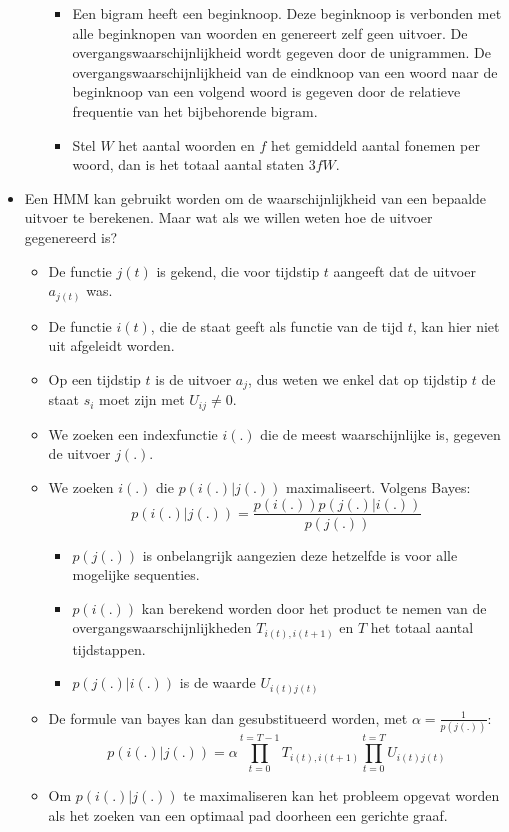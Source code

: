 \begin{itemize}
\begin{itemize}
\begin{itemize}
		\item Een bigram heeft een beginknoop. Deze beginknoop is verbonden met alle beginknopen van woorden en genereert zelf geen uitvoer. De overgangswaarschijnlijkheid wordt gegeven door de unigrammen. De overgangswaarschijnlijkheid van de eindknoop van een woord naar de beginknoop van een volgend woord is gegeven door de relatieve frequentie van het bijbehorende bigram.
		\item Stel $W$ het aantal woorden en $f$ het gemiddeld aantal fonemen per woord, dan is het totaal aantal staten $3fW$.
	\end{itemize}
	\end{itemize}
	\item Een HMM kan gebruikt worden om de waarschijnlijkheid van een bepaalde uitvoer te berekenen. Maar wat als we willen weten hoe de uitvoer gegenereerd is? 
	\begin{itemize}
		\item De functie $j(t)$ is gekend, die voor tijdstip $t$ aangeeft dat de uitvoer $a_{j(t)}$ was.
		\item De functie $i(t)$, die de staat geeft als functie van de tijd $t$, kan hier niet uit afgeleidt worden.
		\item Op een tijdstip $t$ is de uitvoer $a_j$, dus weten we enkel dat op tijdstip $t$ de staat $s_i$ moet zijn met $U_{ij} \neq 0$.
		\item We zoeken een indexfunctie $i(.)$ die de meest waarschijnlijke is, gegeven de uitvoer $j(.)$. 
		\item We zoeken $i(.)$ die $p(i(.)|j(.))$ maximaliseert. Volgens Bayes:
		$$p(i(.)|j(.)) = \frac{p(i(.))p(j(.)|i(.))}{p(j(.))}$$
		\begin{itemize}
			\item $p(j(.))$ is onbelangrijk aangezien deze hetzelfde is voor alle mogelijke sequenties.
			\item $p(i(.))$ kan berekend worden door het product te nemen van de overgangswaarschijnlijkheden $T_{i(t),i(t + 1)}$ en $T$ het totaal aantal tijdstappen.
			\item $p(j(.)|i(.))$ is de waarde $U_{i(t)j(t)}$
		\end{itemize}
		\item De formule van bayes kan dan gesubstitueerd worden, met $\alpha = \frac{1}{p(j(.))}$:
		$$p(i(.)|j(.)) = \alpha \prod_{t = 0}^{t = T - 1} T_{i(t),i(t + 1)} \prod_{t=0}^{t=T}U_{i(t)j(t)}$$
		\item Om $p(i(.)|j(.))$ te maximaliseren kan het probleem opgevat worden als het zoeken van een optimaal pad doorheen een gerichte graaf.

\end{itemize}
\end{itemize}
